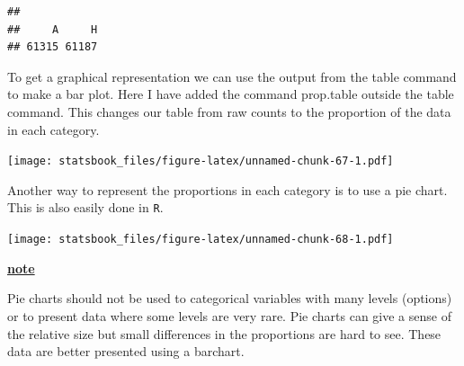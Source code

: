 \documentclass[
]{book}
\newenvironment{Shaded}{\begin{snugshade}}{\end{snugshade}}
\newcommand{\AttributeTok}[1]{\textcolor[rgb]{0.77,0.63,0.00}{#1}}
\newcommand{\FunctionTok}[1]{\textcolor[rgb]{0.00,0.00,0.00}{#1}}
\newcommand{\NormalTok}[1]{#1}
\newcommand{\SpecialCharTok}[1]{\textcolor[rgb]{0.00,0.00,0.00}{#1}}
\newcommand{\StringTok}[1]{\textcolor[rgb]{0.31,0.60,0.02}{#1}}
\newenvironment{rmdblock}[1]
  {\begin{shaded*}
  \centerline{\underline{\textbf{#1}}}

  }
  {
  \end{shaded*}
  }
\newenvironment{note}
  {\begin{rmdblock}{note}}
  {\end{rmdblock}}
\theoremstyle{definition}
\theoremstyle{definition}
\theoremstyle{definition}
\theoremstyle{definition}
\theoremstyle{remark}
\begin{document}
\begin{Shaded}
\end{Shaded}

\begin{verbatim}
## 
##     A     H 
## 61315 61187
\end{verbatim}

To get a graphical representation we can use the output from the table command to make a bar plot. Here I have added the command prop.table outside the table command. This changes our table from raw counts to the proportion of the data in each category.

\begin{Shaded}
\end{Shaded}

\texttt{[image: statsbook\_files/figure-latex/unnamed-chunk-67-1.pdf]}

Another way to represent the proportions in each category is to use a pie chart. This is also easily done in \texttt{R}.

\begin{Shaded}
\end{Shaded}

\texttt{[image: statsbook\_files/figure-latex/unnamed-chunk-68-1.pdf]}

\begin{note}
Pie charts should not be used to categorical variables with many levels (options) or to present data where some levels are very rare. Pie charts can give a sense of the relative size but small differences in the proportions are hard to see. These data are better presented using a barchart.
\end{note}
\end{document}
